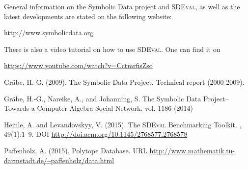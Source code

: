 \documentclass[11pt]{article}
\begin{document}
General information on the Symbolic Data project and \textsc{SDEval}, as well as the
latest developments are stated on the following website:
\begin{center}
\href{http://www.symbolicdata.org}{http://www.symbolicdata.org}
\end{center}
There is also a video tutorial on how to use \textsc{SDEval}. One can find it on
\begin{center}
\href{https://www.youtube.com/watch?v=CctmrfisZso}{https://www.youtube.com/watch?v=CctmrfisZso}
\end{center}


\begin{thebibliography}{}

Gr{\"a}be, H.-G. (2009).
\newblock The {\sc Symbolic Data} Project.
\newblock Technical report (2000-2009).

Gr{\"a}be, H.-G., Nareike, A., and Johanning, S.
\newblock The {\sc Symbolic Data} Project--Towards a Computer Algebra Social
  Network.
 vol. 1186 (2014)

Heinle, A. and Levandovskyy, V. (2015).
\newblock The \textsc{SDEval} Benchmarking Toolkit.
, 49(1):1--9.
\newblock DOI \url{http://doi.acm.org/10.1145/2768577.2768578}

Paffenholz, A. (2015).
\newblock Polytope Database.
\newblock URL \url{http://www.mathematik.tu-darmstadt.de/\~paffenholz/data.html}
\end{thebibliography}
\end{document}
